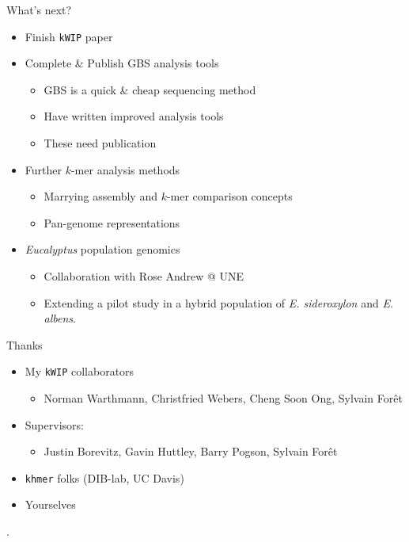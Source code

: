 \documentclass[t]{beamer}
\begin{document}
\begin{frame}{What's next?}
  \begin{itemize}
    \item Finish \texttt{kWIP} paper
    \item Complete \& Publish GBS analysis tools
    \begin{itemize}
      \item GBS is a quick \& cheap sequencing method
      \item Have written improved analysis tools
      \item These need publication
    \end{itemize}
    \pause
    \item Further $k$-mer analysis methods
      \begin{itemize}
        \item Marrying assembly and $k$-mer comparison concepts
        \item Pan-genome representations
      \end{itemize}
    \item \textit{Eucalyptus} population genomics
      \begin{itemize}
        \item Collaboration with Rose Andrew @ UNE
        \item Extending a pilot study in a hybrid population of
          \textit{E. sideroxylon} and \textit{E. albens}.
      \end{itemize}
  \end{itemize}
\end{frame}

\begin{frame}{Thanks}
  \begin{itemize}
    \item My \texttt{kWIP} collaborators
      \begin{itemize}
        \item Norman Warthmann, Christfried Webers, Cheng Soon Ong, Sylvain For\^{e}t
      \end{itemize}
    \item Supervisors:
      \begin{itemize}
        \item Justin Borevitz, Gavin Huttley, Barry Pogson, Sylvain For\^{e}t
      \end{itemize}
    \item \texttt{khmer} folks (DIB-lab, UC Davis)
    \item Yourselves
  \end{itemize}
\end{frame}

\begin{frame}[shrink=20]{}
  \printbibliography
  \vfill
  .
\end{frame}
\end{document}
